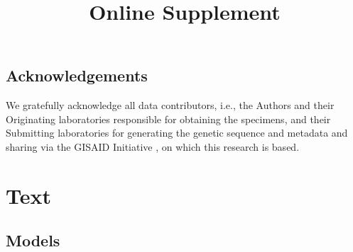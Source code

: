 \documentclass{article}
\newcommand{\beginsupplement}{
  \setcounter{table}{1}  
  \renewcommand{\thetable}{S\arabic{table}} 
  \setcounter{figure}{1} 
  \renewcommand{\thefigure}{S\arabic{figure}}
  \setcounter{section}{0} 
  \renewcommand{\thesection}{S\arabic{section}}
}
\begin{document}

\subsection*{Acknowledgements}

We gratefully acknowledge all data contributors, i.e., the Authors and their
Originating laboratories responsible for obtaining the specimens, and their
Submitting laboratories for generating the genetic sequence and metadata and
sharing via the GISAID Initiative \citep{elbe2017data}, on which this research
is based.



\newpage


\newpage
\beginsupplement
\title{Online Supplement} 
\maketitle
\section{Text}  
\subsection{Models}
\end{document}
